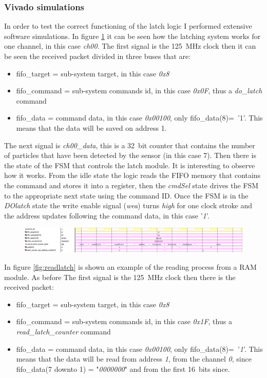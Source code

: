 \subsubsection{Vivado simulations}
\noindent In order to test the correct functioning of the latch logic I performed extensive software simulations. In figure \ref{fig:dolatch} it can be seen how the latching system works for one channel, in this case \textit{ch00}. The first signal is the 125~MHz clock then it can be seen the received packet divided in three buses that are:
\begin{itemize}
	\item fifo\_target = sub-system target, in this case \textit{0x8}
	\item fifo\_command = sub-system commands id, in this case \textit{0x0F}, thus a \textit{do\_latch} command
	\item fifo\_data = command data, in this case \textit{0x00100}, only fifo\_data(8)=~'1'. This means that the data will be saved on address 1.
\end{itemize} 
The next signal is \textit{ch00\_data}, this is a 32~bit counter that contains the number of particles that have been detected by the sensor (in this case 7).
Then there is the state of the FSM that controls the latch module. It is interesting to observe how it works.
From the idle state the logic reads the FIFO memory that contains the command and stores it into a register, then the \textit{cmdSel} state drives the FSM to the appropriate next state using the command ID.
Once the FSM is in the \textit{DOlatch} state the write enable signal (\textit{wea}) turns \textit{high} for one clock stroke and the address updates following the command data, in this case '\textit{1}'.  
\begin{figure}[H]
	\centering
	\includegraphics[width=1.0\linewidth]{IMG/ch4/LATCHsimulations/DOLATCH}
	\caption{}
	\label{fig:dolatch}
\end{figure}
\noindent In figure \ref{fig:readlatch} is shown an example of the reading process from a RAM module. As before The first signal is the 125~MHz clock then there is the received packet:
\begin{itemize}
	\item fifo\_target = sub-system target, in this case \textit{0x8}
	\item fifo\_command = sub-system commands id, in this case \textit{0x1F}, thus a \textit{read\_latch\_counter} command
	\item fifo\_data = command data, in this case \textit{0x00100}, only fifo\_data(8)=~'\textit{1}'. This means that the data will be read from address \textit{1}, from the channel \textit{0}, since fifo\_data(7 downto 1) = "\textit{0000000}" and from the first 16~bits since.
\end{itemize}
